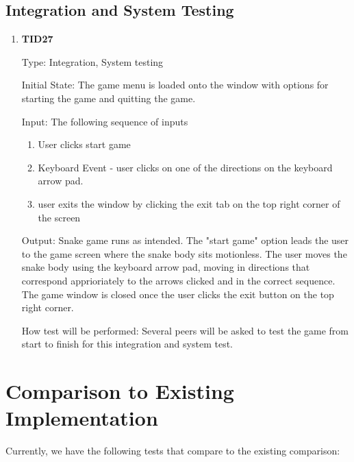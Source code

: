 \documentclass[12pt, titlepage]{article}
\begin{document}
\subsection{Integration and System Testing}

\begin{enumerate}

\item{\textbf{TID27}\\}

Type: Integration, System testing
					
Initial State: The game menu is loaded onto the window with options for starting the game and quitting the game.
					
Input: The following sequence of inputs

\begin{enumerate}
\item User clicks start game
\item  Keyboard Event - user clicks on one of the directions on the keyboard arrow pad.
\item user exits the window by clicking the exit tab on the top right corner of the screen  
\end{enumerate}					

Output: Snake game runs as intended. The "start game" option leads the user to the game screen where the snake body sits motionless. The user moves the snake body using the keyboard arrow pad, moving in directions that correspond apprioriately to the arrows clicked and in the correct sequence. The game window is closed once the user clicks the exit button on the top right corner.	
			
How test will be performed: Several peers will be asked to test the game from start to finish for this integration and system test.


\end{enumerate}
	
\section{Comparison to Existing Implementation}	
				
Currently, we have the following tests that compare to the existing comparison:
\end{document}
